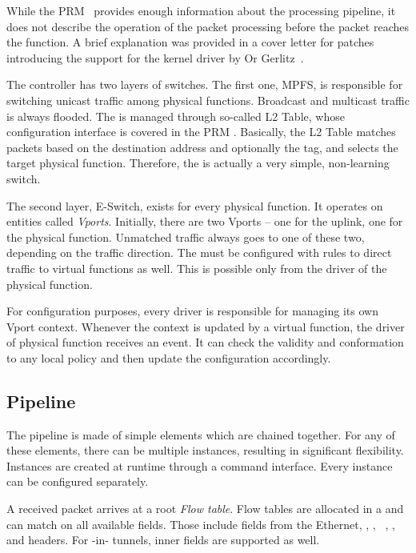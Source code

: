 While the PRM~\cite{mlx-prm} provides enough information about the processing
pipeline, it does not describe the operation of the packet processing before
the packet reaches the  function. A brief explanation was provided in
a cover letter for patches introducing the  support for the kernel driver
by Or Gerlitz~\cite{lwn-mlx-sriov}.

The controller has two layers of switches. The first one, \acrfull{MPFS}, is
responsible for switching unicast traffic among physical functions. Broadcast
and multicast traffic is always flooded. The  is managed through
so-called L2 Table, whose configuration interface is covered in the PRM
\cite{mlx-prm}. Basically, the L2 Table matches packets based on the destination
 address and optionally the  tag, and selects the target physical
function. Therefore, the  is actually a very simple, non-learning
switch.

The second layer, \acrfull{E-Switch}, exists for every physical function.
It operates on entities called \emph{Vports}. Initially, there are two Vports
-- one for the uplink, one for the physical function. Unmatched traffic always
goes to one of these two, depending on the traffic direction. The
 must be configured with rules to direct traffic to virtual
functions as well. This is possible only from the driver of the physical
function.

For configuration purposes, every driver is responsible for managing its
own Vport context. Whenever the context is updated by a virtual function, the
driver of physical function receives an event. It can check the validity and
conformation to any local policy and then update the configuration accordingly.

\subsection{Pipeline}
\label{mlx:pipeline}

The pipeline is made of simple elements which are chained together. For any of
these elements, there can be multiple instances, resulting in significant
flexibility. Instances are created at runtime through a command interface.
Every instance can be configured separately.

A received packet arrives at a root \emph{Flow table}. Flow tables are allocated
in a  and can match on all available fields. Those include fields from the
Ethernet, , , \ , ,  and
 headers. For -in- tunnels, inner fields are supported as
well.

